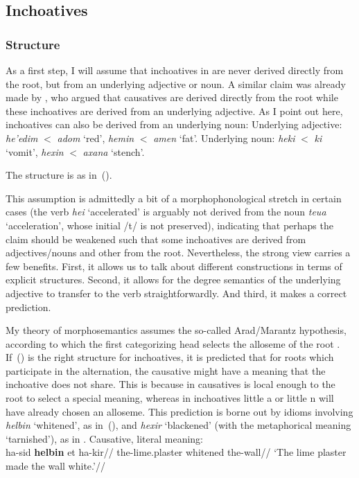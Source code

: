 	\subsection{Inchoatives}
		\subsubsection{Structure}
As a first step, I will assume that inchoatives in {\thif} are never derived directly from the root, but from an underlying adjective or noun. A similar claim was already made by \cite{borer91}, who argued that causatives are derived directly from the root while these inchoatives are derived from an underlying adjective. As I point out here, inchoatives can also be derived from an underlying noun:
\pex
	\a Underlying adjective: \emph{he'edim} $<$ \emph{adom} `red', \emph{hemin} $<$ \emph{amen} `fat'.
	\a Underlying noun: \emph{heki} $<$ \emph{ki} `vomit', \emph{he{\texttslig}xin} $<$ \emph{{\texttslig}axana} `stench'.
\xe

The structure is as in~(\nextx).
\ex
\xe

This assumption is admittedly a bit of a morphophonological stretch in certain cases (the verb \emph{hei{\texttslig}} `accelerated' is arguably not derived from the noun \emph{teu{\texttslig}a} `acceleration', whose initial /t/ is not preserved), indicating that perhaps the claim should be weakened such that some inchoatives are derived from adjectives/nouns and other from the root. Nevertheless, the strong view carries a few benefits. First, it allows us to talk about different constructions in terms of explicit structures. Second, it allows for the degree semantics of the underlying adjective to transfer to the verb straightforwardly. And third, it makes a correct prediction. 

My theory of morphosemantics assumes the so-called Arad/Marantz hypothesis, according to which the first categorizing head selects the alloseme of the root \citep{arad03,marantz13,elenasamioti14}. If~(\lastx) is the right structure for inchoatives, it is predicted that for roots which participate in the alternation, the causative might have a meaning that the inchoative does not share. This is because in causatives {\vd} is local enough to the root to select a special meaning, whereas in inchoatives little a or little n will have already chosen an alloseme. This prediction is borne out by idioms involving \emph{helbin} `whitened', as in~(\nextx), and \emph{hexir} `blackened' (with the metaphorical meaning `tarnished'), as in \citet[79]{kastner16phd}.
\pex
	\a Causative, literal meaning:\\
		\begingl
			\gla ha-sid \textbf{helbin} et ha-kir//
			\glb the-lime.plaster whitened  the-wall//
			\glft `The lime plaster made the wall white.'//
		\endgl
	

